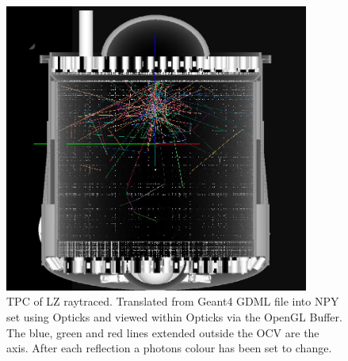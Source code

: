 \begin{figure}
\includegraphics[width=10cm]{Figures/Simulations/LZ_S1_photons_In_Opticks.png}
\centering
\caption{TPC of LZ raytraced. Translated from Geant4 GDML file into NPY set using Opticks and viewed within Opticks via the OpenGL Buffer.
The blue, green and red lines extended outside the OCV are the axis. After each reflection a photons colour has been set to change.}
\label{fig:OpticksLZTPC_S1_Photons}
\end{figure}